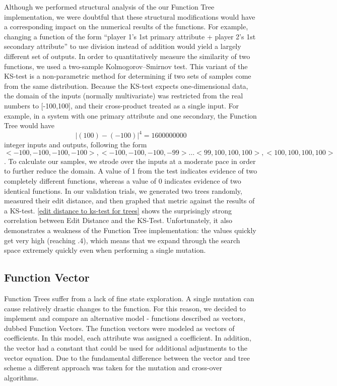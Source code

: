 \documentclass{acm_proc_article-sp}
\begin{document}
Although we performed structural analysis of the our Function Tree implementation, we were doubtful that these structural modifications would have a corresponding impact on the numerical results of the functions. For example, changing a function of the form “player 1’s 1st primary attribute + player 2’s 1st secondary attribute” to use division instead of addition would yield a largely different set of outputs. In order to quantitatively measure the similarity of two functions, we used a two-sample Kolmogorov–Smirnov test. This variant of the KS-test is a non-parametric method for determining if two sets of samples come from the same distribution. 
Because the KS-test expects one-dimensional data, the domain of the inputs (normally multivariate) was restricted from the real numbers to [-100,100], and their cross-product treated as a single input. For example, in a system with one primary attribute and one secondary, the Function Tree would have $$|(100) - (-100)|^4 = 1600000000$$ integer inputs and outputs, following the form $$<-100, -100, -100, -100> , <-100, -100, -100, -99> … <99, 100, 100, 100> , <100, 100, 100, 100>$$. To calculate our samples, we strode over the inputs at a moderate pace in order to further reduce the domain. A value of 1 from the test indicates evidence of two completely different functions, whereas a value of 0 indicates evidence of two identical functions.
In our validation trials, we generated two trees randomly, measured their edit distance, and then graphed that metric against the results of a KS-test. \ref{edit distance to ks-test for trees} shows the surprisingly strong correlation between Edit Distance and the KS-Test. Unfortunately, it also demonstrates a weakness of the Function Tree implementation: the values quickly get very high (reaching .4), which means that we expand through the search space extremely quickly even when performing a single mutation.

\subsection{Function Vector}

Function Trees suffer from a lack of fine state exploration. A single mutation can cause relatively drastic changes to the function. For this reason, we decided to implement and compare an alternative model - functions described as vectors, dubbed Function Vectors.
The function vectors were modeled as vectors of coefficients. In this model, each attribute was assigned a coefficient. In addition, the vector had a constant that could be used for additional adjustments to the vector equation. Due to the fundamental difference between the vector and tree scheme a different approach was taken for the mutation and cross-over algorithms. 
\end{document}
